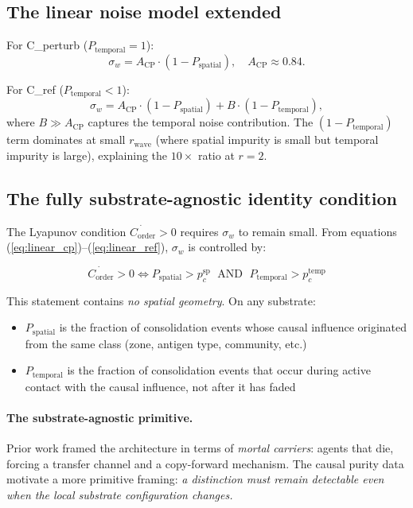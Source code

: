 \documentclass[11pt,a4paper]{article}
\newcommand{\Corder}{C_{\mathrm{order}}}
\newcommand{\Psp}{P_{\mathrm{spatial}}}
\newcommand{\Ptemp}{P_{\mathrm{temporal}}}
\begin{document}
\subsection{The linear noise model extended}

For C\_perturb ($\Ptemp = 1$):
\begin{equation}
  \sigma_w = A_\mathrm{CP} \cdot (1 - \Psp), \quad A_\mathrm{CP} \approx 0.84.
  \label{eq:linear_cp}
\end{equation}

For C\_ref ($\Ptemp < 1$):
\begin{equation}
  \sigma_w = A_\mathrm{CP} \cdot (1 - \Psp) + B \cdot (1 - \Ptemp),
  \label{eq:linear_ref}
\end{equation}
where $B \gg A_\mathrm{CP}$ captures the temporal noise contribution.
The $(1-\Ptemp)$ term dominates at small $r_\mathrm{wave}$ (where spatial impurity
is small but temporal impurity is large), explaining the $10\times$ ratio at $r=2$.

\subsection{The fully substrate-agnostic identity condition}

The Lyapunov condition $\dot{\Corder} > 0$ requires $\sigma_w$ to remain small.
From equations (\ref{eq:linear_cp})--(\ref{eq:linear_ref}), $\sigma_w$ is controlled by:

\begin{equation}
  \boxed{
  \dot{\Corder} > 0
  \iff
  \Psp > p_c^\mathrm{sp} \;\text{ AND }\; \Ptemp > p_c^\mathrm{temp}
  }
  \label{eq:full_condition}
\end{equation}

This statement contains \emph{no spatial geometry}. On any substrate:
\begin{itemize}
  \item $\Psp$ is the fraction of consolidation events whose causal influence originated
    from the same class (zone, antigen type, community, etc.)
  \item $\Ptemp$ is the fraction of consolidation events that occur during active contact
    with the causal influence, not after it has faded
\end{itemize}

\paragraph{The substrate-agnostic primitive.}
Prior work framed the architecture in terms of \emph{mortal carriers}: agents that die,
forcing a transfer channel and a copy-forward mechanism.
The causal purity data motivate a more primitive framing:
\emph{a distinction must remain detectable even when the local substrate configuration changes.}
\end{document}
